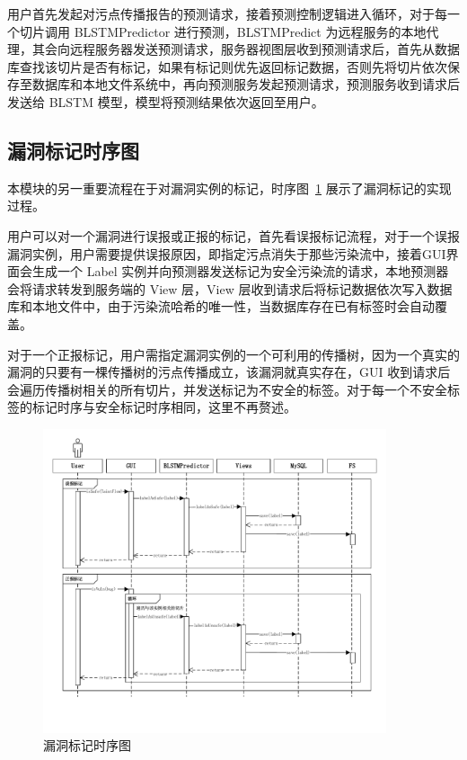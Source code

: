 用户首先发起对污点传播报告的预测请求，接着预测控制逻辑进入循环，对于每一个切片调用 BLSTMPredictor 进行预测，BLSTMPredict 为远程服务的本地代理，其会向远程服务器发送预测请求，服务器视图层收到预测请求后，首先从数据库查找该切片是否有标记，如果有标记则优先返回标记数据，否则先将切片依次保存至数据库和本地文件系统中，再向预测服务发起预测请求，预测服务收到请求后发送给 BLSTM 模型，模型将预测结果依次返回至用户。

\subsection{漏洞标记时序图}

本模块的另一重要流程在于对漏洞实例的标记，时序图~\ref{labelTime} 展示了漏洞标记的实现过程。

用户可以对一个漏洞进行误报或正报的标记，首先看误报标记流程，对于一个误报漏洞实例，用户需要提供误报原因，即指定污点消失于那些污染流中，接着GUI界面会生成一个 Label 实例并向预测器发送标记为安全污染流的请求，本地预测器会将请求转发到服务端的 View 层，View 层收到请求后将标记数据依次写入数据库和本地文件中，由于污染流哈希的唯一性，当数据库存在已有标签时会自动覆盖。

对于一个正报标记，用户需指定漏洞实例的一个可利用的传播树，因为一个真实的漏洞的只要有一棵传播树的污点传播成立，该漏洞就真实存在，GUI 收到请求后会遍历传播树相关的所有切片，并发送标记为不安全的标签。对于每一个不安全标签的标记时序与安全标记时序相同，这里不再赘述。


\begin{figure}[htbp]
    \centering
    \includegraphics[width=0.9\textwidth]{FIGs/chapter4/labelTime.pdf}
    \caption{漏洞标记时序图}\label{labelTime}
\end{figure}

